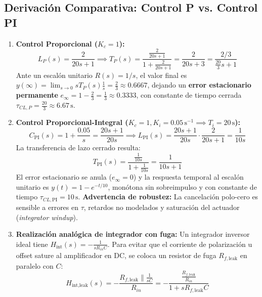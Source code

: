 \documentclass[11pt, a4paper]{article}
\begin{document}
\subsection{Derivación Comparativa: Control P vs. Control PI}
\begin{enumerate}[noitemsep]
    \item \textbf{Control Proporcional ($K_c = 1$):}
    \begin{equation}
        L_P(s) = \frac{2}{20s + 1} \implies T_P(s) = \frac{\frac{2}{20s+1}}{1 + \frac{2}{20s+1}} = \frac{2}{20s + 3} = \frac{2/3}{\frac{20}{3}s + 1}
    \end{equation}
    Ante un escalón unitario $R(s) = 1/s$, el valor final es $y(\infty) = \lim_{s\to 0} s T_P(s) \frac{1}{s} = \frac{2}{3} \approx 0.6667$, dejando un \textbf{error estacionario permanente} $e_\infty = 1 - \frac{2}{3} = \frac{1}{3} \approx 0.3333$, con constante de tiempo cerrada $\tau_{CL,P} = \frac{20}{3} \approx 6.67\,\text{s}$.
    \item \textbf{Control Proporcional-Integral ($K_c = 1, K_i = 0.05\,\text{s}^{-1} \implies T_i = 20\,\text{s}$):}
    \begin{equation}
        C_{\text{PI}}(s) = 1 + \frac{0.05}{s} = \frac{20s + 1}{20s} \implies L_{\text{PI}}(s) = \frac{20s + 1}{20s} \cdot \frac{2}{20s + 1} = \frac{1}{10s}
    \end{equation}
    La transferencia de lazo cerrado resulta:
    \begin{equation}
        T_{\text{PI}}(s) = \frac{\frac{1}{10s}}{1 + \frac{1}{10s}} = \frac{1}{10s + 1}
    \end{equation}
    El error estacionario se anula ($e_\infty = 0$) y la respuesta temporal al escalón unitario es $y(t) = 1 - e^{-t/10}$, monótona sin sobreimpulso y con constante de tiempo $\tau_{CL,\text{PI}} = 10\,\text{s}$. \textbf{Advertencia de robustez:} La cancelación polo-cero es sensible a errores en $\tau$, retardos no modelados y saturación del actuador (\textit{integrator windup}).
    \item \textbf{Realización analógica de integrador con fuga:} Un integrador inversor ideal tiene $H_{\text{int}}(s) = -\frac{1}{s R_{in} C}$. Para evitar que el corriente de polarización u offset sature al amplificador en DC, se coloca un resistor de fuga $R_{f,\text{leak}}$ en paralelo con $C$:
    \begin{equation}
        H_{\text{int,leak}}(s) = -\frac{R_{f,\text{leak}} \parallel \frac{1}{sC}}{R_{in}} = -\frac{\frac{R_{f,\text{leak}}}{R_{in}}}{1 + s R_{f,\text{leak}} C}
    \end{equation}
\end{enumerate}
\end{document}
